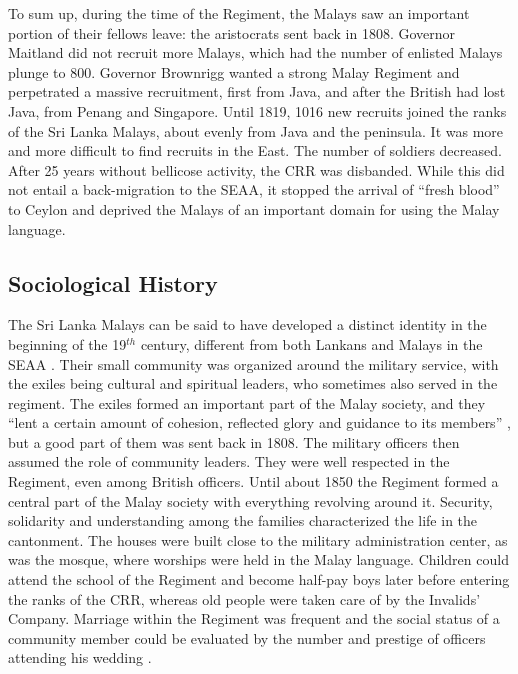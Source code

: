 To sum up, during the time of the Regiment, the Malays saw an important
portion of their fellows leave: the aristocrats sent back in 1808.
Governor Maitland did not recruit more Malays, which had the
number of enlisted Malays plunge to 800. Governor Brownrigg wanted a
strong Malay Regiment and perpetrated a massive recruitment, first
from Java, and after the British had lost Java, from Penang and
Singapore. Until 1819, 1016 new recruits joined the ranks of the
Sri Lanka Malays, about evenly from Java and the peninsula.
It was more and more difficult to find recruits in the East. The
number of soldiers decreased. After 25 years without bellicose
activity, the CRR was disbanded. While this did not entail a
back-migration to the SEAA, it stopped the arrival of ``fresh
blood'' to Ceylon and deprived the Malays of an important domain
for using the Malay language.

\subsection{Sociological History}\label{sec:slmbg:SociologicalHistoryundertheBritish}
 
The Sri Lanka Malays can be said to have developed a distinct
identity in the beginning of the 19$^{th}$ century,  different from both
Lankans and Malays in the SEAA \citep[11]{Hussainmiya1987}.
 Their small community was organized around the military service, with the
exiles being cultural and spiritual leaders, who sometimes also
served in the regiment. The exiles formed an
important part of the Malay society, and they ``lent a certain
amount of cohesion, reflected glory and guidance to its
members'' \citep[79]{Hussainmiya1990}, but a good part of them was
sent back in 1808. The military officers then assumed the role of
community leaders. They were well respected in the Regiment, even
among British officers. Until about
1850 the Regiment formed a central part of the Malay society with
every\-thing revolving around it. Security, solidarity and
understanding among the families characterized the life in the
cantonment. The houses were built close to the military
administration center, as was the mosque, where worships were held
in the Malay language. Children could attend the school of the
Regiment and become half-pay boys later before entering the ranks
of the CRR, whereas old people were taken care of by the Invalids'
Company. Marriage within the Regiment was frequent and the
social status of a community member could be evaluated by the
number and prestige of officers attending his wedding \citep{Hussainmiya1987,Hussainmiya1990}. 


